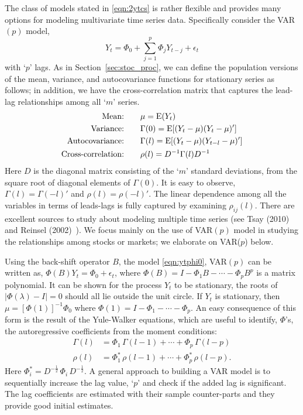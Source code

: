 The class of models stated in \eqref{eqn:2ytcs} is rather flexible and provides many options for modeling multivariate time series data. Specifically consider the VAR$(p)$ model,
	\begin{equation} \label{eqn:ytphi0}
	Y_{t} = \Phi_0 + \sum_{j=1}^{p} \Phi_jY_{t-j} + \epsilon_t 
	\end{equation}
with `$p$' lags. As in Section~\ref{sec:stoc_proc}, we can define the population versions of the mean, variance, and autocovariance functions for stationary series as follows; in addition, we have the cross-correlation matrix that captures the lead-lag relationships among all `$m$' series.
	\begin{equation} \label{eq:meanvarianceauto}
        \begin{aligned}
	\text{Mean:\qquad} & \mu= \Ex(Y_t) \\
	\text{Variance:\qquad} & \Gamma(0)= \Ex[(Y_t - \mu)(Y_t - \mu)'] \\
	\text{Autocovariance:\qquad} & \Gamma(l)= \Ex[(Y_t - \mu)(Y_{t-l} - \mu)'] \\
	\text{Cross-correlation:\qquad} & \rho(l) = D^{-1}\Gamma(l) D^{-1}
        \end{aligned}
        \end{equation}
Here $D$ is the diagonal matrix consisting of the `$m$' standard deviations, from the square root of diagonal elements of $\Gamma(0)$. It is easy to observe,  $\Gamma(l)= \Gamma(-l)'$ and $\rho(l)= \rho(-l)'$. The linear dependence among all the variables in terms of leads-lags is fully captured by examining $\rho_{ij}(l)$. There are excellent sources to study about modeling multiple time series (see Tsay (2010)~\cite{tsay} and Reinsel (2002)~\cite{2002reinsel}). We focus mainly on the use of  VAR$(p)$ model in studying the relationships among stocks or markets; we elaborate on VAR($p$) below.


Using the back-shift operator $B$, the model \eqref{eqn:ytphi0}, VAR$(p)$ can be written as, $ \Phi(B)Y_t= \Phi_0 + \epsilon_t$, where $\Phi(B)= I - \Phi_1 B - \cdots - \Phi_p B^p$ is a matrix polynomial. It can be shown for the process $Y_t$ to be stationary, the roots of $\lvert \Phi(\lambda)-I \rvert= 0$ should all lie outside the unit circle. If $Y_t$ is stationary, then $\mu= [\Phi(1)]^{-1} \Phi_0$ where $\Phi(1)= I - \Phi_1 - \cdots - \Phi_p$. An easy consequence of this form is the result of the Yule-Walker equations, which are useful to identify, $\Phi$'s, the autoregressive coefficients from the moment conditions:
	\begin{equation} \label{eqn:2gammarho}
	\begin{aligned}
	\Gamma(l)&= \Phi_1 \,\Gamma(l-1) +\cdots + \Phi_p\, \Gamma(l-p) \\
	\rho(l)&= \Phi_1^* \,\rho(l-1) + \cdots + \Phi_p^* \, \rho(l-p).
	\end{aligned}
	\end{equation}
Here $\Phi_i^*= D^{-\frac{1}{2}} \,\Phi_i\, D^{-\frac{1}{2}}$. A general approach to building a VAR model is to sequentially increase the lag value, `$p$' and check if the added lag is significant. The lag coefficients are estimated with their sample counter-parts and they provide good initial estimates. 


